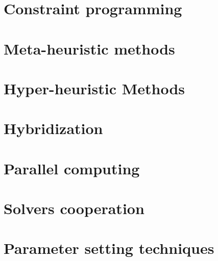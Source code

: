 
\section{Constraint programming}\label{sec:cp}


\section{Meta-heuristic methods}\label{sec:meta}


\section{Hyper-heuristic Methods}\label{sec:hyper}


\section{Hybridization}\label{sec:hybrid}


\section{Parallel computing}\label{sec:parallel}


\section{Solvers cooperation}\label{sec:cooperation}


\section{Parameter setting techniques}
\label{sec:tunning}

